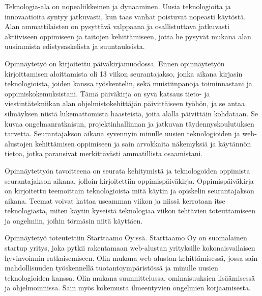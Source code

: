 \documentclass[11pt,a4paper,titlepage,oneside]{article}
\begin{document}

Teknologia-ala on nopealiikkeinen ja dynaaminen. 
Uusia teknologioita ja innovaatioita syntyy jatkuvasti, kun taas vanhat poistuvat nopeasti käytöstä.
Alan ammattilaisten on pysyttävä valppaana ja osallistuttava jatkuvasti aktiiviseen oppimiseen ja taitojen kehittämiseen,
jotta he pysyvät mukana alan uusimmista edistysaskelista ja suuntauksista.
\medskip




Opinnäytetyö on kirjoitettu päiväkirjamuodossa. 
Ennen opinnäytetyön kirjoittamisen aloittamista oli 13 viikon seurantajakso, jonka aikana kirjasin teknologioista,
joiden kanssa työskentelin, sekä muistiinpanoja toiminnastani ja oppimiskokemuksistani.
Tämä päiväkirja on syvä katsaus tieto- ja viestintätekniikan alan ohjelmistokehittäjän päivittäiseen työhön,
ja se antaa silmäyksen niistä lukemattomista haasteista, joita alalla päivittäin kohdataan.
Se kuvaa ongelmanratkaisun, projektinhallinnan ja jatkuvan täydennyskoulutuksen tarvetta.
Seurantajakson aikana syvennyin minulle uusien teknologioiden ja web-alustojen kehittämisen oppimiseen ja sain arvokkaita näkemyksiä ja käytännön tietoa,
jotka paransivat merkittävästi ammatillista osaamistani.
\medskip



% 
Opinnäytettyön tavoitteena on seurata kehitymistä ja teknologoiden oppimista seurantajakson aikana,
jolloin kirjoitettiin oppimispäiväkirja.
% 
Oppimispäiväkirja on kirjoitettu teemoittain teknologioista mitä käytin ja opiskelin seurantajakson aikana.
Teemat voivat kattaa useamman viikon ja niissä kerrotaan itse teknologiasta, miten käytin kyseistä teknologiaa viikon tehtävien toteuttamiseen ja
ongelmiin, joihin törmäsin niitä käyttäen.
\medskip






Opinnäytetyö toteutettiin Starttaamo Oy:ssä. Starttaamo Oy on suomalainen startup yritys,
 joka pytkii rakentamaan web-alustan yrityksille kokonaisvailaisen hyvinvoinnin ratkaisemiseen.
%
% 
%
Olin mukana web-alustan kehittämisessä, jossa
%
sain mahdollisuuden työskennellä tuotantoympäristössä ja minulle uusien teknologioiden kanssa.
Olin mukana suunnittelussa, ominaisuuksien lisäämisessä ja ohjelmoinnissa. 
Sain myös kokemusta ilmeentyvien ongelmien korjaamisesta.
\end{document}
